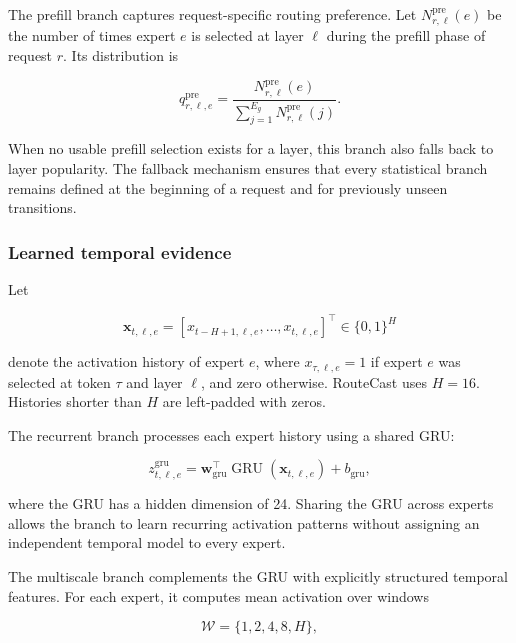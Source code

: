 \documentclass[conference]{IEEEtran}
\begin{document}
The prefill branch captures request-specific routing preference. Let
\(N_{r,\ell}^{\mathrm{pre}}(e)\) be the number of times expert \(e\) is
selected at layer \(\ell\) during the prefill phase of request \(r\). Its
distribution is

\begin{equation}
q_{r,\ell,e}^{\mathrm{pre}}
=
\frac{
N_{r,\ell}^{\mathrm{pre}}(e)
}{
\displaystyle
\sum_{j=1}^{E_g}
N_{r,\ell}^{\mathrm{pre}}(j)
}.
\label{eq:prefill-prior}
\end{equation}

When no usable prefill selection exists for a layer, this branch also falls
back to layer popularity. The fallback mechanism ensures that every
statistical branch remains defined at the beginning of a request and for
previously unseen transitions.

\subsubsection{Learned temporal evidence}

Let

\begin{equation}
\mathbf{x}_{t,\ell,e}
=
\left[
x_{t-H+1,\ell,e},
\ldots,
x_{t,\ell,e}
\right]^{\top}
\in\{0,1\}^{H}
\label{eq:expert-history}
\end{equation}

denote the activation history of expert \(e\), where
\(x_{\tau,\ell,e}=1\) if expert \(e\) was selected at token \(\tau\) and
layer \(\ell\), and zero otherwise. RouteCast uses \(H=16\). Histories shorter
than \(H\) are left-padded with zeros.

The recurrent branch processes each expert history using a shared GRU:

\begin{equation}
z_{t,\ell,e}^{\mathrm{gru}}
=
\mathbf{w}_{\mathrm{gru}}^{\top}
\operatorname{GRU}
\left(
\mathbf{x}_{t,\ell,e}
\right)
+
b_{\mathrm{gru}},
\label{eq:gru-branch}
\end{equation}

where the GRU has a hidden dimension of 24. Sharing the GRU across experts
allows the branch to learn recurring activation patterns without assigning an
independent temporal model to every expert.

The multiscale branch complements the GRU with explicitly structured temporal
features. For each expert, it computes mean activation over windows

\begin{equation}
\mathcal{W}=\{1,2,4,8,H\},
\label{eq:multiscale-windows}
\end{equation}
\end{document}

